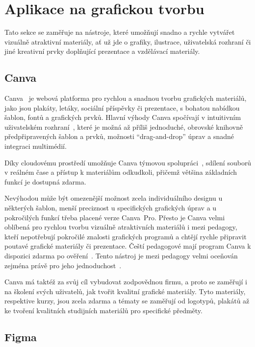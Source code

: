 \section{Aplikace na grafickou tvorbu}\label{text:analyza/grafika}

Tato sekce se zaměřuje na nástroje, které umožňují snadno a rychle vytvářet vizuálně atraktivní materiály, ať už jde o grafiky, ilustrace, uživatelská rozhraní či jiné kreativní prvky doplňující prezentace a vzdělávací materiály.

\subsection{Canva}\label{text:canva}

Canva~\cite{canva_website} je webová platforma pro rychlou a snadnou tvorbu grafických materiálů, jako jsou plakáty, letáky, sociální příspěvky či prezentace, s bohatou nabídkou šablon, fontů a grafických prvků. 
Hlavní výhody Canva spočívají v intuitivním uživatelském rozhraní~\cite{canva_recenze}, které je možná až příliš jednoduché, obrovské knihovně předpřipravených šablon a prvků, možnosti \enquote{drag-and-drop} úprav a snadné integraci multimédií.

Díky cloudovému prostředí umožňuje Canva týmovou spolupráci~\cite{canva_live_help, canva_live_features}, sdílení souborů v reálném čase a přístup k materiálům odkudkoli, přičemž většina základních funkcí je dostupná zdarma. 

Nevýhodou může být omezenější možnost zcela individuálního designu u některých šablon, menší preciznost u specifických grafických úprav a u pokročilých funkcí třeba placené verze Canva~Pro. 
Přesto je Canva velmi oblíbená pro rychlou tvorbu vizuálně atraktivních materiálů i mezi pedagogy, kteří nepotřebují pokročilé znalosti grafických programů a chtějí rychle připravit poutavé grafické materiály či prezentace.
Čeští pedagogové mají program Canva k dispozici zdarma po ověření~\cite{canva_education}. Tento nástroj je mezi pedagogy velmi oceňován zejména právě pro jeho jednoduchost~\cite{canva_facebook}.

Canva má taktéž za svůj cíl vybudovat zodpovědnou firmu, a proto se zaměřují i na školení svých uživatelů, jak tvořit kvalitní grafické materiály.
Tyto materiály, respektive kurzy, jsou zcela zdarma a tématy se zaměřují od logotypů, plakátů až ke tvoření kvalitních studijních materiálů pro specifické předměty.


\subsection{Figma}\label{text:figma_popis}

